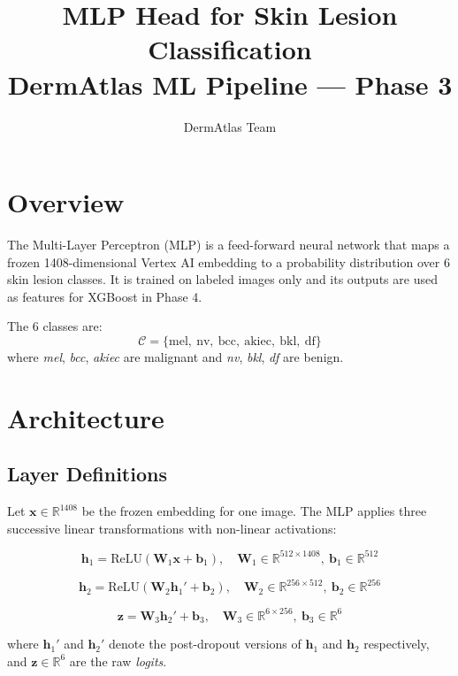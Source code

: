 \documentclass[12pt]{article}
\title{\textbf{MLP Head for Skin Lesion Classification}\\
\large DermAtlas ML Pipeline --- Phase 3}
\author{DermAtlas Team}
\date{}
\begin{document}
\maketitle
\tableofcontents
\newpage

\section{Overview}

The Multi-Layer Perceptron (MLP) is a feed-forward neural network that maps a
frozen 1408-dimensional Vertex AI embedding to a probability distribution over
6 skin lesion classes. It is trained on labeled images only and its outputs are
used as features for XGBoost in Phase 4.

\medskip
\noindent The 6 classes are:
\[
\mathcal{C} = \{\text{mel},\ \text{nv},\ \text{bcc},\ \text{akiec},\ \text{bkl},\ \text{df}\}
\]
where \textit{mel}, \textit{bcc}, \textit{akiec} are malignant and
\textit{nv}, \textit{bkl}, \textit{df} are benign.

\section{Architecture}

\subsection{Layer Definitions}

Let $\bm{x} \in \mathbb{R}^{1408}$ be the frozen embedding for one image.
The MLP applies three successive linear transformations with non-linear
activations:

\[
\bm{h}_1 = \text{ReLU}\!\left(\bm{W}_1 \bm{x} + \bm{b}_1\right),
\quad \bm{W}_1 \in \mathbb{R}^{512 \times 1408},\ \bm{b}_1 \in \mathbb{R}^{512}
\]

\[
\bm{h}_2 = \text{ReLU}\!\left(\bm{W}_2 \bm{h}_1' + \bm{b}_2\right),
\quad \bm{W}_2 \in \mathbb{R}^{256 \times 512},\ \bm{b}_2 \in \mathbb{R}^{256}
\]

\[
\bm{z} = \bm{W}_3 \bm{h}_2' + \bm{b}_3,
\quad \bm{W}_3 \in \mathbb{R}^{6 \times 256},\ \bm{b}_3 \in \mathbb{R}^{6}
\]

where $\bm{h}_1'$ and $\bm{h}_2'$ denote the post-dropout versions of
$\bm{h}_1$ and $\bm{h}_2$ respectively, and $\bm{z} \in \mathbb{R}^6$ are
the raw \textit{logits}.
\end{document}
